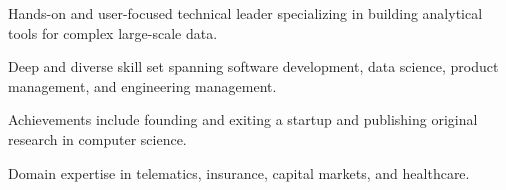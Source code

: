 

\begin{cvparagraph}

Hands-on and user-focused technical leader specializing in building analytical tools for complex large-scale data.

Deep and diverse skill set spanning software development, data science, product management, and engineering management.

Achievements include founding and exiting a startup and publishing original research in computer science. 

Domain expertise in telematics, insurance, capital markets, and healthcare. 

\end{cvparagraph}
